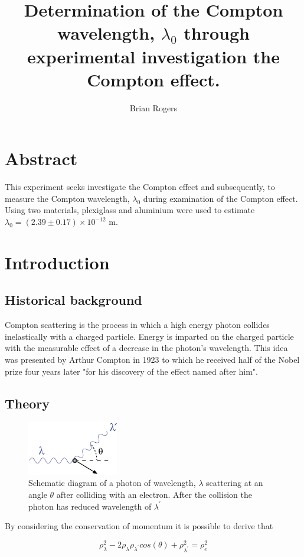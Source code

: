 \documentclass{article}%
\title{Determination of the Compton wavelength, $\lambda_0$ through experimental investigation the Compton effect.}%
\author{Brian Rogers}
\date{}%
\begin{document}
%
\maketitle
\section*{Abstract}
This experiment seeks investigate the Compton effect and subsequently, to measure the Compton wavelength, $\lambda_0$ during examination of the Compton effect. Using two materials, plexiglass and aluminium were used to estimate $\lambda_0 = (2.39 \pm 0.17) \times 10^{-12}$ m. 
\section{Introduction}
\subsection{Historical background}
Compton scattering is the process in which a high energy photon collides inelastically with a charged particle. Energy is imparted on the charged particle with the measurable effect of a decrease in the photon's wavelength.
This idea was presented by Arthur Compton in 1923 \cite{Compton} to which he received half of the Nobel prize four years later "for his discovery of the effect named after him". \cite{Nobel}
\subsection{Theory}

\begin{figure}[H]
    \centering%
    \includegraphics[width=150px]{compton_scattering_diagram.png}
    \caption{Schematic diagram of a photon of wavelength, $\lambda$ scattering at an angle $\theta$ after colliding with an electron. After the collision the photon has reduced wavelength of $\lambda^{\prime}$ \cite{Diagram}}%
\end{figure}
By considering the conservation of momentum it is possible to derive that 

\begin{equation}
    \rho_{\lambda}^2 - 2\rho_{\lambda}\rho_{\lambda^\prime}cos(\theta) + \rho_{\lambda^\prime}^2 = \rho_{e}^2
\end{equation}
\end{document}
